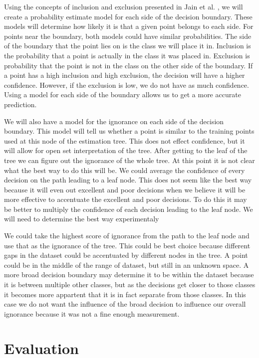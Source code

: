 \documentclass[conference]{IEEEtran}
\begin{document}
Using the concepts of inclusion and exclusion presented in Jain et al. \cite{CAP}, we will create a probability estimate model for
each side of the decision boundary.  These models will determine how likely it is that a given point belongs to each side.  For points near the boundary, both models could have similar probabilities.  The side of the boundary that the point lies on is the
class we will place it in.  Inclusion is the probability that a point is actually in the class it was placed in.  Exclusion is probability that the point is not in the class on the other side of the boundary.  If a point has a high inclusion and high exclusion, the decision will have a higher confidence.  However, if the exclusion is low, we do not have as much confidence.  Using a model for each side of the boundary allows us to get a more accurate prediction.
 
 We will also have a model for the ignorance on each side of the decision boundary.  This model will tell us whether a point is similar to the training points used at this node of the estimation tree.  This does not effect confidence, but it will allow for open set interpretation of the tree.  After getting to the leaf of the tree we can figure out the ignorance of the whole tree.  At this point it is not clear what the best way to do this will be.  We could average the confidence of every decision on the path leading to a leaf node.  This does not seem like the best way because it will even out excellent and poor decisions when we believe it will be more effective to accentuate the excellent and poor decisions.  To do this it may be better to multiply the confidence of each decision leading to the leaf node.  We will need to determine the best way experimentaly \par
 
 We could take the highest score of ignorance from the path to the leaf node and use that as the ignorance of the tree.  This could be best choice because different gaps in the dataset could be accentuated by different nodes in the tree.  A point could be in the middle of the range of dataset, but still in an unknown space.  A more broad decision boundary may determine it to be within the dataset because it is between multiple other classes, but as the decisions get closer to those classes it becomes more appartent that it is in fact separate from those classes.  In this case we do not want the influence of the broad decision to influence our overall ignorance because it was not a fine enough measurement.  
\section{Evaluation}
\end{document}
